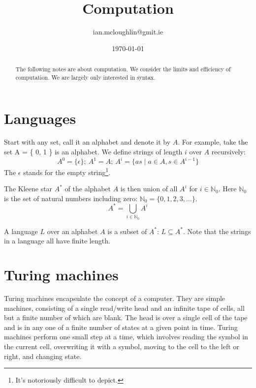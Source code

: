 

\title{Computation}
\author{ian.mcloughlin@gmit.ie}
\date{\today}

\newcommand{\CC}[1]{\textbf{#1}}



\maketitle
 
\begin{abstract}
  The following notes are about computation.
  We consider the limits and efficiency of computation.
  We are largely only interested in syntax.
\end{abstract}

\section{Languages}
Start with any set, call it an alphabet and denote it by \( A \).
  For example, take the set A = \{ 0, 1 \} is an alphabet.
  We define strings of length \( i \) over \( A \) recursively:
  \[
    A^0 = \{ \epsilon \}; \ 
    A^1 = A; \ 
    A^{i} = \{ as \mid a \in A, s \in A^{i-1} \}
  \]
  The \( \epsilon \) stands for the empty string\footnote{It's notoriously difficult to depict.}.

  The Kleene star \( A^* \) of the alphabet \( A \) is then union of all \( A^i \) for \( i \in \mathbb{N}_0 \).
  Here \( \mathbb{N}_0 \) is the set of natural numbers including zero: \( \mathbb{N}_0 = \{ 0, 1, 2, 3, \ldots \} \).
  \[ A^* = \bigcup_{i \in \mathbb{N}_0} A^i\]

  A language \( L \) over an alphabet \( A \) is a subset of \( A^* \): \( L \subseteq A^* \).
  Note that the strings in a language all have finite length.

\section{Turing machines}
  Turing machines encapsulate the concept of a computer.
  They are simple machines, consisting of a single read/write head and an infinite tape of cells, all but a finite number of which are blank.  
  The head is over a single cell of the tape and is in any one of a finite number of states at a given point in time.
  Turing machines perform one small step at a time, which involves reading the symbol in the current cell, overwriting it with a symbol, moving to the cell to the left or right, and changing state.

